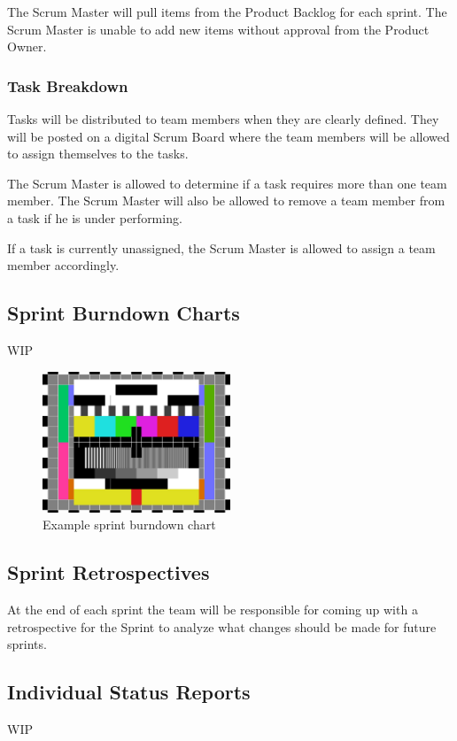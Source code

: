 The Scrum Master will pull items from the Product Backlog for each sprint. The Scrum Master is unable to add new items without approval from the Product Owner.

\subsubsection{Task Breakdown}
Tasks will be distributed to team members when they are clearly defined. They will be posted on a digital Scrum Board where the team members will be allowed to assign themselves to the tasks. 

The Scrum Master is allowed to determine if a task requires more than one team member. The Scrum Master will also be allowed to remove a team member from a task if he is under performing.

If a task is currently unassigned, the Scrum Master is allowed to assign a team member accordingly.

\subsection{Sprint Burndown Charts}
WIP

\begin{figure}[h!]
    \centering
    \includegraphics[width=0.5\textwidth]{images/test_image}
    \caption{Example sprint burndown chart}
\end{figure}

\subsection{Sprint Retrospectives}
At the end of each sprint the team will be responsible for coming up with a retrospective for the Sprint to analyze what changes should be made for future sprints.

\subsection{Individual Status Reports}
WIP

